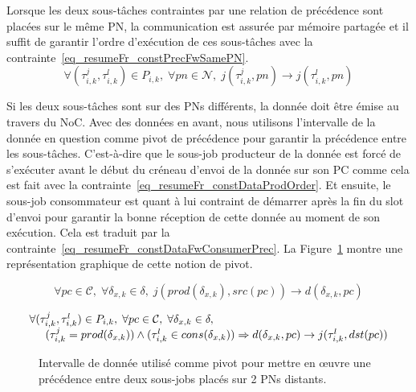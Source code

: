 \documentclass[main.tex]{subfiles}
\begin{document}
\begin{description}
        Lorsque les deux sous-tâches contraintes par une relation de précédence sont placées sur le même PN, la communication est assurée par mémoire partagée et il suffit de garantir l'ordre d'exécution de ces sous-tâches avec la contrainte~\ref{eq_resumeFr_constPrecFwSamePN}.
\begin{equation}
    \label{eq_resumeFr_constPrecFwSamePN}
    \forall (\tau_{i,k}^j , \tau_{i,k}^l) \in P_{i,k}, \; \forall pn \in \mathcal{N} , \; 
    j( \tau_{i,k}^j , pn ) \to j( \tau_{i,k}^l , pn )
\end{equation}

        Si les deux sous-tâches sont sur des PNs différents, la donnée doit être émise au travers du NoC. Avec des données en avant, nous utilisons l'intervalle de la donnée en question comme pivot de précédence pour garantir la précédence entre les sous-tâches. C'est-à-dire que le sous-job producteur de la donnée est forcé de s'exécuter avant le début du créneau d'envoi de la donnée sur son PC comme cela est fait avec la contrainte~\ref{eq_resumeFr_constDataProdOrder}. Et ensuite, le sous-job consommateur est quant à lui contraint de démarrer après la fin du slot d'envoi pour garantir la bonne réception de cette donnée au moment de son exécution. Cela est traduit par la contrainte~\ref{eq_resumeFr_constDataFwConsumerPrec}. La Figure~\ref{fig_resumeFr_constFwDataPrec} montre une représentation graphique de cette notion de pivot.

\begin{equation}
    \label{eq_resumeFr_constDataProdOrder}
    \forall pc \in \mathcal{C} , \; \forall \delta_{x,k} \in \delta , \;
    j(prod(\delta_{x,k}) , src(pc)) \to d( \delta_{x,k} , pc )   
\end{equation}

\begin{equation}
    \label{eq_resumeFr_constDataFwConsumerPrec}
    \begin{array}{l}
        \forall (\tau_{i,k}^j , \tau_{i,k}^l) \in P_{i,k}, \; \forall pc \in \mathcal{C} , \; \forall \delta_{x,k} \in \delta , \;  \\
        \hspace{5mm} (\tau_{i,k}^j = prod(\delta_{x,k})) \land (\tau_{i,k}^l \in cons(\delta_{x,k})) 
        \Rightarrow d( \delta_{x,k} , pc ) \to j(\tau_{i,k}^l , dst(pc)) 
    \end{array}
\end{equation}

\begin{figure}
    \centering
    \scalebox{0.9}{}
    \caption{Intervalle de donnée utilisé comme pivot pour mettre en \oe{}uvre une précédence entre deux sous-jobs placés sur 2 PNs distants.}
    \label{fig_resumeFr_constFwDataPrec}
\end{figure}


\end{description}
\end{document}
